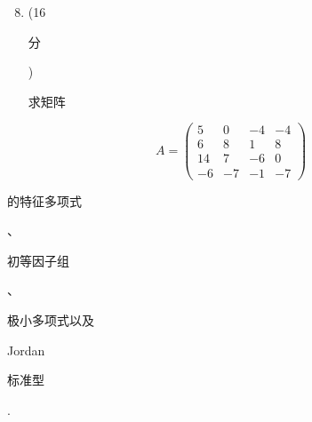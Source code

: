 \documentclass[10pt]{article}
\begin{document}
\begin{enumerate}
  \setcounter{enumi}{7}
  \item (16 \begin{CJK}{UTF8}{mj}分\end{CJK}) \begin{CJK}{UTF8}{mj}求矩阵\end{CJK}
\end{enumerate}
$$
A=\left(\begin{array}{cccc}
5 & 0 & -4 & -4 \\
6 & 8 & 1 & 8 \\
14 & 7 & -6 & 0 \\
-6 & -7 & -1 & -7
\end{array}\right)
$$
\begin{CJK}{UTF8}{mj}的特征多项式\end{CJK}、\begin{CJK}{UTF8}{mj}初等因子组\end{CJK}、\begin{CJK}{UTF8}{mj}极小多项式以及\end{CJK} Jordan \begin{CJK}{UTF8}{mj}标准型\end{CJK}.
\end{document}
